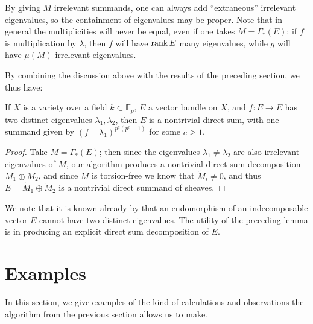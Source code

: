 \documentclass[12pt]{article}
\let\l\lambda
\numberwithin{equation}{section}
\theoremstyle{theorem}
\numberwithin{thm}{section}
\theoremstyle{definition}
\begin{document}
\begin{exa}
By giving $M$ irrelevant summands, one can always add ``extraneous'' irrelevant eigenvalues, so the containment of eigenvalues may be proper.
Note that in general the multiplicities will never be equal, even if one takes $M=\Gamma_*(E)$: if $f$ is multiplication by $\l$, then $f$ will have $\operatorname{rank} E$ many eigenvalues, while $g$ will have $\mu(M)$ irrelevant eigenvalues.
\end{exa}

By combining the discussion above with the results of the preceding section, we thus have:

\begin{prop}
If $X$ is a variety over a field $k\subset \overline{\mathbb F_{p}}$,
$E$ a vector bundle on $X$, and $f:E\to E$ has two distinct eigenvalues $\l_1,\l_2$, then $E$ is a nontrivial direct sum, with one summand given by $(f-\l_1)^{p^e(p^e-1)}$ for some $e\geq 1$.
\end{prop}

\begin{proof}
Take $M= \Gamma_*(E)$; then since the eigenvalues $\l_1\neq \l_2$ are also irrelevant eigenvalues of $M$, our algorithm produces a nontrivial direct sum decomposition $M_1\oplus M_2$, and since $M$ is torsion-free we know that $\widetilde M_i\neq 0$, and thus $E=\widetilde M_1\oplus \widetilde M_2$ is a nontrivial direct summand of sheaves.
\end{proof}

\begin{rem}
We note that it is known already by \cite[Proposition~15]{Atiyah57} that an endomorphism of an indecomposable vector $E$ cannot have two distinct eigenvalues. The utility of the preceding lemma is in producing an explicit direct sum decomposition of $E$.
\end{rem}



\section{Examples}

In this section, we give examples of the kind of calculations and observations the algorithm from the previous section allows us to make.
\end{document}
